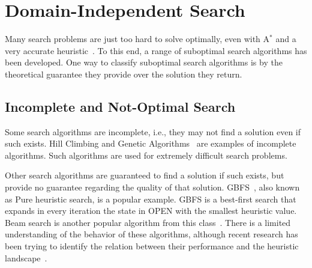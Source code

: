\documentclass{article}
\newcommand{\open}{\textsc{OPEN}\xspace}
\newcommand{\astar}{A$^*$\xspace}
\newcommand{\gbfs}{\ac{GBFS}\xspace}
\begin{document}


\section{Domain-Independent Search}


Many search problems are just too hard to solve optimally, even with \astar and a very accurate heuristic~\cite{helmert2008good}. 
To this end, a range of suboptimal search algorithms has been developed. 
One way to classify suboptimal search algorithms is by the theoretical guarantee they provide over the solution they return. 

\subsection{Incomplete and Not-Optimal Search}
Some search algorithms are incomplete, i.e., they may not find a solution even if such exists. 
Hill Climbing and Genetic Algorithms~\cite{holland1992genetic}
are examples of incomplete algorithms. Such algorithms are used for extremely difficult search problems. 

Other search algorithms are guaranteed to find a solution if such exists, but provide no guarantee regarding the quality of that solution. \gbfs~\cite{doran1966experiments}, also known as Pure heuristic search, is a popular example. \gbfs is a best-first search that expands in every iteration the state in \open with the smallest heuristic value. Beam search is another popular algorithm from this class~\cite{zhou2005beam,sabuncuoglu1999job,furcy2005limited}. 
There is a limited understanding of the behavior of these algorithms, although recent research has been trying to identify the relation between their performance and the heuristic landscape~\cite{wilt2016effective,heusner2018best}. 
\end{document}
